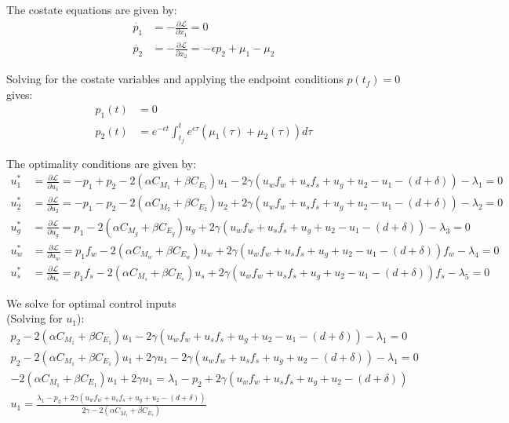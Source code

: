 \documentclass[12pt]{article}
\begin{document}
The costate equations are given by:
\begin{align*}
    \dot{p_1} &= -\frac{\partial \mathcal{L}}{\partial x_1} = 0 \\
    \dot{p_2} &= -\frac{\partial \mathcal{L}}{\partial x_2} = -\epsilon p_2 + \mu_1 - \mu_2
\end{align*}

Solving for the costate variables and applying the endpoint conditions $p(t_f) = 0$  gives:
\begin{align*}
    p_1(t) &= 0 \\
    p_2(t) &= e^{-\epsilon t} \int_{t_f}^t e^{\epsilon \tau} (\mu_1(\tau) + \mu_2(\tau)) d\tau
\end{align*}


The optimality conditions are given by:
\begin{align*}
    u_1^* &= \frac{\partial \mathcal{L}}{\partial u_1} = -p_1 + p_2 - 2(\alpha C_{M_1} + \beta C_{E_1})u_1 - 2\gamma (u_w f_w + u_s f_s + u_g + u_2 - u_1 - (d + \delta)) - \lambda_1 = 0 \\
    u_2^* &= \frac{\partial \mathcal{L}}{\partial u_2} = -p_1 - p_2 - 2(\alpha C_{M_2} + \beta C_{E_2})u_2 + 2\gamma (u_w f_w + u_s f_s + u_g + u_2 - u_1 - (d + \delta)) - \lambda_2 = 0 \\
    u_g^* &= \frac{\partial \mathcal{L}}{\partial u_g} = p_1 - 2(\alpha C_{M_g} + \beta C_{E_g})u_g + 2\gamma (u_w f_w + u_s f_s + u_g + u_2 - u_1 - (d + \delta)) - \lambda_3 = 0\\
    u_w^* &= \frac{\partial \mathcal{L}}{\partial u_w} = p_1f_w - 2(\alpha C_{M_w} + \beta C_{E_w})u_w + 2\gamma (u_w f_w + u_s f_s + u_g + u_2 - u_1 - (d + \delta))f_w - \lambda_4 = 0\\
    u_s^* &= \frac{\partial \mathcal{L}}{\partial u_s} = p_1f_s - 2(\alpha C_{M_s} + \beta C_{E_s})u_s + 2\gamma (u_w f_w + u_s f_s + u_g + u_2 - u_1 - (d + \delta))f_s - \lambda_5 = 0
\end{align*}

We solve for optimal control inputs \\

(Solving for $u_1$):
\begin{align*}
    p_2 - 2(\alpha C_{M_1} + \beta C_{E_1})u_1 - 2\gamma (u_w f_w + u_s f_s + u_g + u_2 - u_1 - (d + \delta)) - \lambda_1 = 0 \\
    p_2 - 2(\alpha C_{M_1} + \beta C_{E_1})u_1 + 2\gamma u_1 - 2\gamma (u_w f_w + u_s f_s + u_g + u_2 - (d + \delta)) - \lambda_1 = 0 \\
    - 2(\alpha C_{M_1} + \beta C_{E_1})u_1 + 2\gamma u_1 = \lambda_1 - p_2 + 2\gamma (u_w f_w + u_s f_s + u_g + u_2 - (d + \delta)) \\
    u_1 = \frac{\lambda_1 - p_2 + 2\gamma (u_w f_w + u_s f_s + u_g + u_2 - (d + \delta))}{2\gamma - 2(\alpha C_{M_1} + \beta C_{E_1})} \\
\end{align*}
\end{document}
